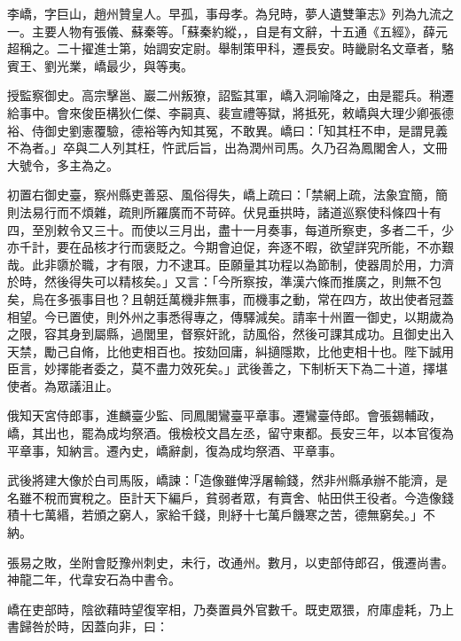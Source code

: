 
\begin{pinyinscope}

 李嶠，字巨山，趙州贊皇人。早孤，事母孝。為兒時，夢人遺雙筆志》列為九流之一。主要人物有張儀、蘇秦等。「蘇秦約縱，，自是有文辭，十五通《五經》，薛元超稱之。二十擢進士第，始調安定尉。舉制策甲科，遷長安。時畿尉名文章者，駱賓王、劉光業，嶠最少，與等夷。



 授監察御史。高宗擊邕、巖二州叛獠，詔監其軍，嶠入洞喻降之，由是罷兵。稍遷給事中。會來俊臣構狄仁傑、李嗣真、裴宣禮等獄，將抵死，敕嶠與大理少卿張德裕、侍御史劉憲覆驗，德裕等內知其冤，不敢異。嶠曰：「知其枉不申，是謂見義不為者。」卒與二人列其枉，忤武后旨，出為潤州司馬。久乃召為鳳閣舍人，文冊大號令，多主為之。



 初置右御史臺，察州縣吏善惡、風俗得失，嶠上疏曰：「禁網上疏，法象宜簡，簡則法易行而不煩雜，疏則所羅廣而不苛碎。伏見垂拱時，諸道巡察使科條四十有四，至別敕令又三十。而使以三月出，盡十一月奏事，每道所察吏，多者二千，少亦千計，要在品核才行而褒貶之。今期會迫促，奔逐不暇，欲望詳究所能，不亦艱哉。此非隳於職，才有限，力不逮耳。臣願量其功程以為節制，使器周於用，力濟於時，然後得失可以精核矣。」又言：「今所察按，準漢六條而推廣之，則無不包矣，烏在多張事目也？且朝廷萬機非無事，而機事之動，常在四方，故出使者冠蓋相望。今已置使，則外州之事悉得專之，傳驛減矣。請率十州置一御史，以期歲為之限，容其身到屬縣，過閭里，督察奸訛，訪風俗，然後可課其成功。且御史出入天禁，勵己自脩，比他吏相百也。按劾回庸，糾擿隱欺，比他吏相十也。陛下誠用臣言，妙擇能者委之，莫不盡力效死矣。」武後善之，下制析天下為二十道，擇堪使者。為眾議沮止。



 俄知天宮侍郎事，進麟臺少監、同鳳閣鸞臺平章事。遷鸞臺侍郎。會張錫輔政，嶠，其出也，罷為成均祭酒。俄檢校文昌左丞，留守東都。長安三年，以本官復為平章事，知納言。遷內史，嶠辭劇，復為成均祭酒、平章事。



 武後將建大像於白司馬阪，嶠諫：「造像雖俾浮屠輸錢，然非州縣承辦不能濟，是名雖不稅而實稅之。臣計天下編戶，貧弱者眾，有賣舍、帖田供王役者。今造像錢積十七萬緡，若頒之窮人，家給千錢，則紓十七萬戶饑寒之苦，德無窮矣。」不納。



 張易之敗，坐附會貶豫州刺史，未行，改通州。數月，以吏部侍郎召，俄遷尚書。神龍二年，代韋安石為中書令。



 嶠在吏部時，陰欲藉時望復宰相，乃奏置員外官數千。既吏眾猥，府庫虛耗，乃上書歸咎於時，因蓋向非，曰：




\end{pinyinscope}
